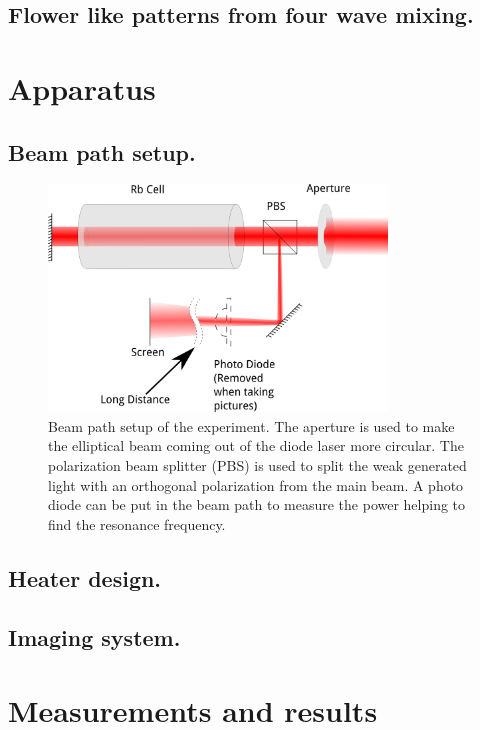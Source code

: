 \documentclass[aps,twocolumn,secnumarabic,balancelastpage,amsmath,amssymb,nofootinbib]{revtex4}
\begin{document}
\subsection{Flower like patterns from four wave mixing.}

\section{Apparatus}
\subsection{Beam path setup.}
\begin{figure}
  \includegraphics[width=9cm]{apparatus.png}
  \caption{Beam path setup of the experiment. The aperture is used to make the elliptical beam coming out of the diode laser more circular. The polarization beam splitter (PBS) is used to split the weak generated light with an orthogonal polarization from the main beam. A photo diode can be put in the beam path to measure the power helping to find the resonance frequency.}
  \label{apparatus}
\end{figure}
\subsection{Heater design.}
\subsection{Imaging system.}

\section{Measurements and results}
\end{document}
